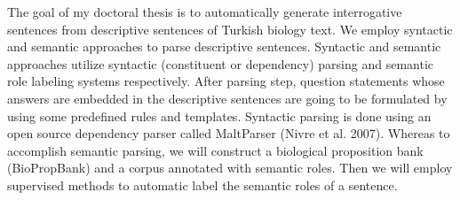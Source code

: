 The goal of my doctoral thesis is to automatically generate interrogative sentences from descriptive sentences of Turkish biology text. We employ syntactic and semantic approaches to parse descriptive sentences. Syntactic and semantic approaches utilize syntactic (constituent or dependency) parsing and semantic role labeling systems respectively. After parsing step, question statements whose answers are embedded in the descriptive sentences are going to be formulated by using some predefined rules and templates. Syntactic parsing is done using an open source dependency parser called MaltParser (Nivre et al. 2007). Whereas to accomplish semantic parsing, we will construct a biological proposition bank (BioPropBank) and a corpus annotated with semantic roles. Then we will employ supervised methods to automatic label the semantic roles of a sentence.
